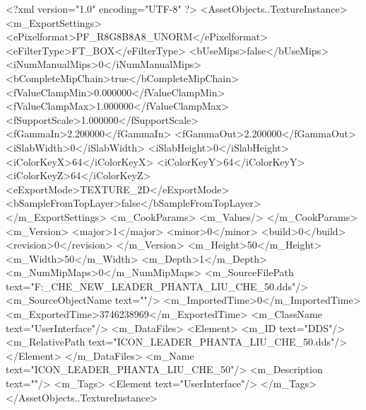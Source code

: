 <?xml version="1.0" encoding="UTF-8" ?>
<AssetObjects..TextureInstance>
	<m_ExportSettings>
		<ePixelformat>PF_R8G8B8A8_UNORM</ePixelformat>
		<eFilterType>FT_BOX</eFilterType>
		<bUseMips>false</bUseMips>
		<iNumManualMips>0</iNumManualMips>
		<bCompleteMipChain>true</bCompleteMipChain>
		<fValueClampMin>0.000000</fValueClampMin>
		<fValueClampMax>1.000000</fValueClampMax>
		<fSupportScale>1.000000</fSupportScale>
		<fGammaIn>2.200000</fGammaIn>
		<fGammaOut>2.200000</fGammaOut>
		<iSlabWidth>0</iSlabWidth>
		<iSlabHeight>0</iSlabHeight>
		<iColorKeyX>64</iColorKeyX>
		<iColorKeyY>64</iColorKeyY>
		<iColorKeyZ>64</iColorKeyZ>
		<eExportMode>TEXTURE_2D</eExportMode>
		<bSampleFromTopLayer>false</bSampleFromTopLayer>
	</m_ExportSettings>
	<m_CookParams>
		<m_Values/>
	</m_CookParams>
	<m_Version>
		<major>1</major>
		<minor>0</minor>
		<build>0</build>
		<revision>0</revision>
	</m_Version>
	<m_Height>50</m_Height>
	<m_Width>50</m_Width>
	<m_Depth>1</m_Depth>
	<m_NumMipMaps>0</m_NumMipMaps>
	<m_SourceFilePath text="F:\MOD\TEMPLATE\LIU_CHE_NEW\ICON_LEADER_PHANTA_LIU_CHE_50.dds"/>
	<m_SourceObjectName text=""/>
	<m_ImportedTime>0</m_ImportedTime>
	<m_ExportedTime>3746238969</m_ExportedTime>
	<m_ClassName text="UserInterface"/>
	<m_DataFiles>
		<Element>
			<m_ID text="DDS"/>
			<m_RelativePath text="ICON_LEADER_PHANTA_LIU_CHE_50.dds"/>
		</Element>
	</m_DataFiles>
	<m_Name text="ICON_LEADER_PHANTA_LIU_CHE_50"/>
	<m_Description text=""/>
	<m_Tags>
		<Element text="UserInterface"/>
	</m_Tags>
</AssetObjects..TextureInstance>


